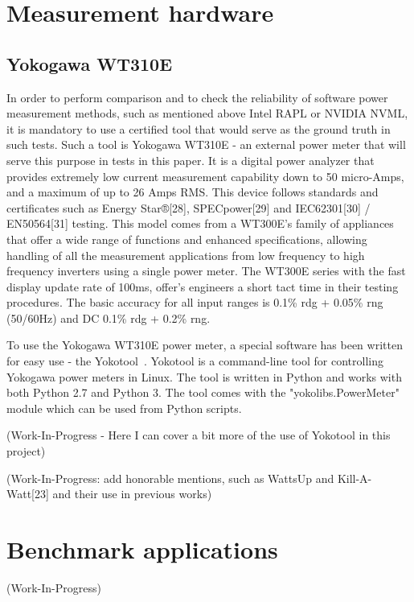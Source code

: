 \section{Measurement hardware}

\subsection{Yokogawa WT310E}

In order to perform comparison and to check the reliability
of software power measurement methods, such as mentioned
above Intel RAPL or NVIDIA NVML, it is mandatory to use
a certified tool that would serve as the ground truth in
such tests. Such a tool is Yokogawa WT310E - an external
power meter that will serve this purpose in tests in this paper.
It is a digital power analyzer that provides extremely low
current measurement capability down to 50 micro-Amps, and
a maximum of up to 26 Amps RMS. This device follows standards
and certificates such as Energy Star®[28], SPECpower[29] and
IEC62301[30] / EN50564[31] testing. This model comes from
a WT300E's family of appliances that offer a wide range of
functions and enhanced specifications, allowing handling of
all the measurement applications from low frequency to high
frequency inverters using a single power meter. The WT300E
series with the fast display update rate of 100ms, offer's
engineers a short tact time in their testing procedures.
The basic accuracy for all input ranges is 0.1\% rdg + 0.05\%
rng (50/60Hz) and DC 0.1\% rdg + 0.2\% rng.

To use the Yokogawa WT310E power meter, a special software has
been written for easy use - the Yokotool~\cite{GitHub_intel/yoko-tool}.
Yokotool is a command-line tool for controlling Yokogawa power
meters in Linux. The tool is written in Python and works with both
Python 2.7 and Python 3. The tool comes with the
"yokolibs.PowerMeter" module which can be used from Python scripts.

(Work-In-Progress - Here I can cover a bit more of the use
of Yokotool in this project)

(Work-In-Progress: add honorable mentions, such as WattsUp
and Kill-A-Watt[23] and their use in previous works)

\section{Benchmark applications}

(Work-In-Progress)

